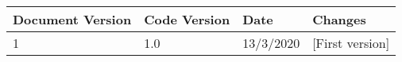 \begin{table}[h]
\centering
\begin{tabular}%
{p{2cm}p{2cm}p{2.5cm}p{7cm}}
Document Version & Code Version & Date & Changes \\
\hline
1 & 1.0 & 13/3/2020 & [First version]
\end{tabular}
\end{table}

